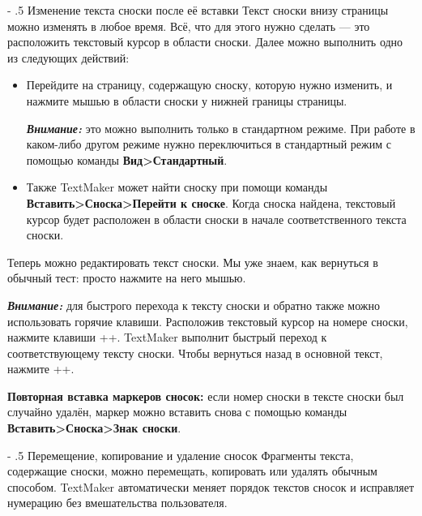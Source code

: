 ﻿\documentclass[a4paper,10pt]{article}
\makeatletter
\renewcommand\paragraph{%
   \@startsection{paragraph}{4}{0mm}%
      {-\baselineskip}%
      {.5\baselineskip}%
      {\normalfont\normalsize\bfseries}}
\makeatother
\begin{document}
\paragraph{Изменение текста сноски после её вставки}
Текст сноски внизу страницы можно изменять в любое время. Всё, что для этого нужно сделать — это расположить текстовый курсор в области сноски. Далее можно выполнить одно из следующих действий:
\begin{itemize}
 \item Перейдите на страницу, содержащую сноску, которую нужно изменить, и нажмите мышью в области сноски у нижней границы страницы.
 
 \textit{\textbf{Внимание:}} это можно выполнить только в стандартном режиме. При работе в каком-либо другом режиме нужно переключиться в стандартный режим с помощью команды \textbf{Вид>Стандартный}.
 \item Также TextMaker может найти сноску при помощи команды \textbf{Вставить>Сноска>Перейти к сноске}. Когда сноска найдена, текстовый курсор будет расположен в области сноски в начале соответственного текста сноски.
\end{itemize}

Теперь можно редактировать текст сноски. Мы уже знаем, как вернуться в обычный тест: просто нажмите на него мышью.

\begin{mdframed}[backgroundcolor=blue!10]
\textbf{\textit{Внимание:}} для быстрого перехода к тексту сноски и обратно также можно использовать горячие клавиши. Расположив текстовый курсор на номере сноски, нажмите клавиши ++\keys{\arrowkeydown}. TextMaker выполнит быстрый переход к соответствующему тексту сноски. Чтобы вернуться назад в основной текст, нажмите ++\keys{\arrowkeyup}.
\end{mdframed}

\textbf{Повторная вставка маркеров сносок:} если номер сноски в тексте сноски был случайно удалён, маркер можно вставить снова с помощью команды \textbf{Вставить>Сноска>Знак сноски}.

\paragraph{Перемещение, копирование и удаление сносок}
Фрагменты текста, содержащие сноски, можно перемещать, копировать или удалять обычным способом. TextMaker автоматически меняет порядок текстов сносок и исправляет нумерацию без вмешательства пользователя.
\end{document}
